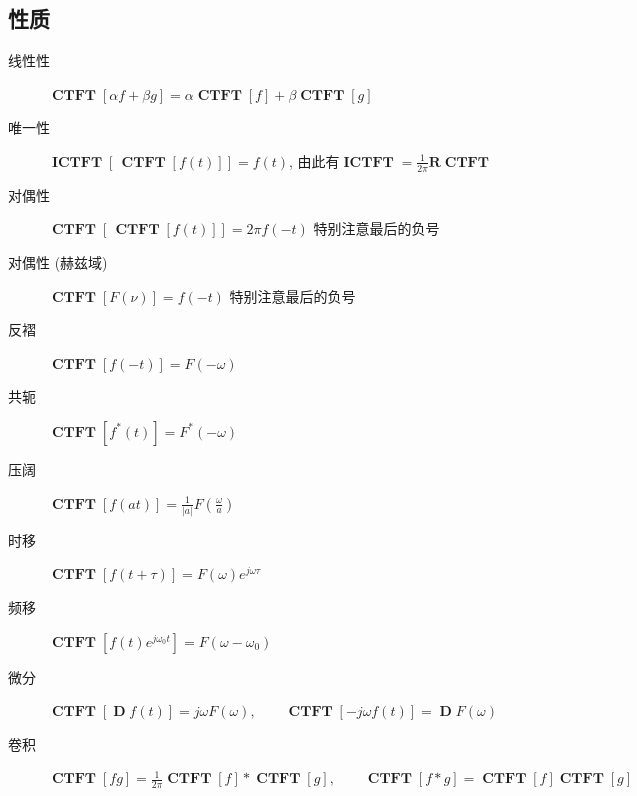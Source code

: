 \documentclass{ctexart}
\DeclareMathOperator{\CTFT}{\mathbf{CTFT}}
\DeclareMathOperator{\ICTFT}{\mathbf{ICTFT}}
\DeclareMathOperator{\D}{\mathbf{D}}
\begin{document}
\subsection{性质}
    \begin{description}
        \item[线性性] $\displaystyle \CTFT[\alpha f + \beta g] = \alpha \CTFT[f] + \beta \CTFT[g]$
        \item[唯一性] $\displaystyle \ICTFT[ \, \CTFT[f(t)] ] = f(t)$,
            由此有$\displaystyle \ICTFT = \frac{1}{2\pi} \mathbf{R} \CTFT$
        \item[对偶性] $\displaystyle \CTFT [ \, \CTFT[ f(t) ] ] = 2 \pi f(-t)$ 特别注意最后的负号
        \item[对偶性 (赫兹域)] $\displaystyle \CTFT [ F(\nu) ] = f(-t)$ 特别注意最后的负号
        \item[反褶] $\displaystyle \CTFT[f(-t)] = F(-\omega)$
        \item[共轭] $\displaystyle \CTFT[f^*(t)] = F^*(-\omega)$
        \item[压阔] $\displaystyle \CTFT[f(at)] = \frac{1}{|a|} F(\frac{\omega}{a})$
        \item[时移] $\displaystyle \CTFT[f(t + \tau)] = F(\omega) e^{j \omega \tau}$
        \item[频移] $\displaystyle \CTFT[f(t) e^{j \omega_0 t}] = F(\omega - \omega_0)$
        \item[微分] $\displaystyle \CTFT[\D f(t)] = j \omega F(\omega),\qquad \CTFT[-j \omega f(t)] = \D F(\omega)$
        \item[卷积] $\displaystyle \CTFT[f g] = \frac{1}{2\pi} \CTFT[f] * \CTFT[g],\qquad \CTFT[f * g] = \CTFT[f] \CTFT[g]$
    \end{description}
\end{document}
